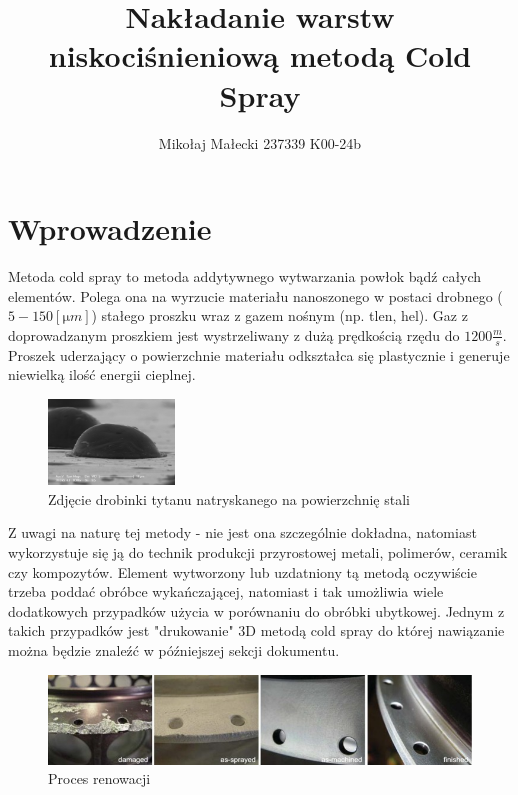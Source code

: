 \documentclass[13pt]{article}
\title{Nakładanie warstw niskociśnieniową metodą Cold Spray}
\author{Mikołaj Małecki 237339 K00-24b}
\begin{document}
	\maketitle
\section{Wprowadzenie}
Metoda cold spray to metoda addytywnego wytwarzania powłok bądź całych elementów. Polega ona na wyrzucie materiału nanoszonego w postaci drobnego ($5-150 [\si{\micro}m]$) stałego proszku wraz z gazem nośnym (np. tlen, hel). Gaz z doprowadzanym proszkiem jest wystrzeliwany z dużą prędkością rzędu do $1200\frac{m}{s}$. Proszek uderzający o powierzchnie materiału odkształca się plastycznie i generuje niewielką ilość energii cieplnej.

\begin{figure}[!h]
	\centering
	\includegraphics[width=0.3\textwidth]{surf.jpeg}
	\caption{Zdjęcie drobinki tytanu natryskanego na powierzchnię stali \cite{wiki}}
\end{figure}

Z uwagi na naturę tej metody - nie jest ona szczególnie dokładna, natomiast wykorzystuje się ją do technik produkcji przyrostowej metali, polimerów, ceramik czy kompozytów. Element wytworzony lub uzdatniony tą metodą oczywiście trzeba poddać obróbce wykańczającej, natomiast i tak umożliwia wiele dodatkowych przypadków użycia w porównaniu do obróbki ubytkowej. Jednym z takich przypadków jest "drukowanie" 3D metodą cold spray do której nawiązanie można będzie znaleźć w późniejszej sekcji dokumentu.

\begin{figure}[!h]
	\centering
	\includegraphics[width=\textwidth]{bef.jpg}
	\caption{Proces renowacji \cite{additive}}
\end{figure}

\newpage
\end{document}
